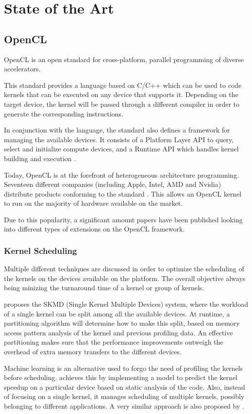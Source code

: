 \chapter{State of the Art}

\section{OpenCL}
OpenCL is an open standard for cross-platform, parallel programming of diverse accelerators. 

This standard provides a language based on C/C++ which can be used to code kernels that can be executed on any device that supports it. Depending on the target device, the kernel will be passed through a different compiler in order to generate the corresponding instructions. 

In conjunction with the language, the standard also defines a framework for managing the available devices. It consists of a Platform Layer API to query, select and initialize compute devices, and a Runtime API which handles kernel building and execution \cite{opencl_overview}. 

Today, OpenCL is at the forefront of heterogeneous architecture programming. Seventeen different companies (including Apple, Intel, AMD and Nvidia) distribute products conforming to the standard \cite{opencl_conformant_companies}. This allows an OpenCL kernel to run on the majority of hardware available on the market.

Due to this popularity, a significant amount papers have been published looking into different types of extensions on the OpenCL framework.

\subsection{Kernel Scheduling}
Multiple different techniques are discussed in order to optimize the scheduling of the kernels on the devices available on the platform. The overall objective always being minizing the turnaround time of a kernel or group of kernels.

\cite{transparent_cpu_gpu_collaboration} proposes the SKMD (Single Kernel Multiple Devices) system, where the workload of a single kernel can be split among all the available devices. At runtime, a partitioning algorithm will determine how to make this split, based on memory access pattern analysis of the kernel and previous profiling data. An effective partitioning makes sure that the performance improvements outweigh the overhead of extra memory transfers to the different devices. 

Machine learning is an alternative used to forgo the need of profiling the kernels before scheduling. \cite{smart_multitasking_scheduling} achieves this by implementing a model to predict the kernel speedup on a particular device based on static analysis of the code. Also, instead of focusing on a single kernel, it manages scheduling of multiple kernels, possibly belonging to different applications. A very similar approach is also proposed by \cite{load_balance_model_opencl_integrated_cluster}.
